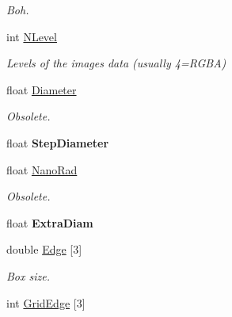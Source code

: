 \begin{DoxyCompactItemize}
\begin{DoxyCompactList}\small\item\em Boh. \end{DoxyCompactList}\item 
int \hyperlink{classDraw_a19d9a879122b0ab65c5e8e3731bd9467}{N\+Level}\hypertarget{classDraw_a19d9a879122b0ab65c5e8e3731bd9467}{}\label{classDraw_a19d9a879122b0ab65c5e8e3731bd9467}

\begin{DoxyCompactList}\small\item\em Levels of the images data (usually 4=R\+G\+BA) \end{DoxyCompactList}\item 
float \hyperlink{classDraw_a90c9c7c0eafa124c8fd3b3a3d95db7d4}{Diameter}\hypertarget{classDraw_a90c9c7c0eafa124c8fd3b3a3d95db7d4}{}\label{classDraw_a90c9c7c0eafa124c8fd3b3a3d95db7d4}

\begin{DoxyCompactList}\small\item\em Obsolete. \end{DoxyCompactList}\item 
float {\bfseries Step\+Diameter}\hypertarget{classDraw_a63674d570288f4010522a408a7436963}{}\label{classDraw_a63674d570288f4010522a408a7436963}

\item 
float \hyperlink{classDraw_a484f4fe71f04b01951ab3b73faf660ac}{Nano\+Rad}\hypertarget{classDraw_a484f4fe71f04b01951ab3b73faf660ac}{}\label{classDraw_a484f4fe71f04b01951ab3b73faf660ac}

\begin{DoxyCompactList}\small\item\em Obsolete. \end{DoxyCompactList}\item 
float {\bfseries Extra\+Diam}\hypertarget{classDraw_aa01b91996d51849456c091594624f240}{}\label{classDraw_aa01b91996d51849456c091594624f240}

\item 
double \hyperlink{classDraw_a8895c89605e91c6cf7430bad336f77c6}{Edge} \mbox{[}3\mbox{]}\hypertarget{classDraw_a8895c89605e91c6cf7430bad336f77c6}{}\label{classDraw_a8895c89605e91c6cf7430bad336f77c6}

\begin{DoxyCompactList}\small\item\em Box size. \end{DoxyCompactList}\item 
int \hyperlink{classDraw_a0a12d9a9a2d537e1eec0bceb7eb9c604}{Grid\+Edge} \mbox{[}3\mbox{]}\hypertarget{classDraw_a0a12d9a9a2d537e1eec0bceb7eb9c604}{}\label{classDraw_a0a12d9a9a2d537e1eec0bceb7eb9c604}


\end{DoxyCompactItemize}
